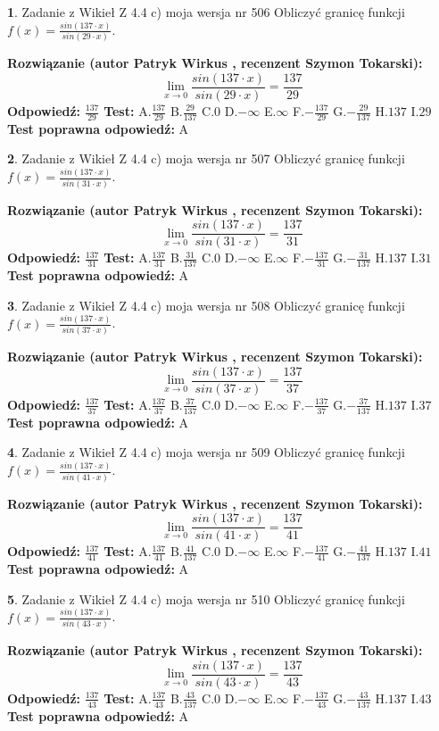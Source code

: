 \documentclass[12pt, a4paper]{article}
\theoremstyle{definition} %
\newtheorem{zad}{}
\newcommand{\zadStart}[1]{\begin{zad}#1\newline}
\newcommand{\zadStop}{\end{zad}}
\newcommand{\rozwStart}[2]{\noindent \textbf{Rozwiązanie (autor #1 , recenzent #2): }\newline}
\newcommand{\rozwStop}{\newline}
\newcommand{\odpStart}{\noindent \textbf{Odpowiedź:}\newline}
\newcommand{\odpStop}{\newline}
\newcommand{\testStart}{\noindent \textbf{Test:}\newline}
\newcommand{\testStop}{\newline}
\newcommand{\kluczStart}{\noindent \textbf{Test poprawna odpowiedź:}\newline}
\newcommand{\kluczStop}{\newline}
\begin{document}
\zadStart{Zadanie z Wikieł Z 4.4 c) moja wersja nr 506}
Obliczyć granicę funkcji $f(x)=\frac{sin(137\cdot x)}{sin(29\cdot x)}$.
\zadStop
\rozwStart{Patryk Wirkus}{Szymon Tokarski}
$$\lim\limits_{x\to 0}\frac{sin(137\cdot x)}{sin(29\cdot x)}=
\frac{137}{29}$$
\rozwStop
\odpStart
$\frac{137}{29}$
\odpStop
\testStart
A.$\frac{137}{29}$
B.$\frac{29}{137}$
C.$0$
D.$-\infty$
E.$\infty$
F.$-\frac{137}{29}$
G.$-\frac{29}{137}$
H.$137$
I.$29$
\testStop
\kluczStart
A
\kluczStop



\zadStart{Zadanie z Wikieł Z 4.4 c) moja wersja nr 507}
Obliczyć granicę funkcji $f(x)=\frac{sin(137\cdot x)}{sin(31\cdot x)}$.
\zadStop
\rozwStart{Patryk Wirkus}{Szymon Tokarski}
$$\lim\limits_{x\to 0}\frac{sin(137\cdot x)}{sin(31\cdot x)}=
\frac{137}{31}$$
\rozwStop
\odpStart
$\frac{137}{31}$
\odpStop
\testStart
A.$\frac{137}{31}$
B.$\frac{31}{137}$
C.$0$
D.$-\infty$
E.$\infty$
F.$-\frac{137}{31}$
G.$-\frac{31}{137}$
H.$137$
I.$31$
\testStop
\kluczStart
A
\kluczStop



\zadStart{Zadanie z Wikieł Z 4.4 c) moja wersja nr 508}
Obliczyć granicę funkcji $f(x)=\frac{sin(137\cdot x)}{sin(37\cdot x)}$.
\zadStop
\rozwStart{Patryk Wirkus}{Szymon Tokarski}
$$\lim\limits_{x\to 0}\frac{sin(137\cdot x)}{sin(37\cdot x)}=
\frac{137}{37}$$
\rozwStop
\odpStart
$\frac{137}{37}$
\odpStop
\testStart
A.$\frac{137}{37}$
B.$\frac{37}{137}$
C.$0$
D.$-\infty$
E.$\infty$
F.$-\frac{137}{37}$
G.$-\frac{37}{137}$
H.$137$
I.$37$
\testStop
\kluczStart
A
\kluczStop



\zadStart{Zadanie z Wikieł Z 4.4 c) moja wersja nr 509}
Obliczyć granicę funkcji $f(x)=\frac{sin(137\cdot x)}{sin(41\cdot x)}$.
\zadStop
\rozwStart{Patryk Wirkus}{Szymon Tokarski}
$$\lim\limits_{x\to 0}\frac{sin(137\cdot x)}{sin(41\cdot x)}=
\frac{137}{41}$$
\rozwStop
\odpStart
$\frac{137}{41}$
\odpStop
\testStart
A.$\frac{137}{41}$
B.$\frac{41}{137}$
C.$0$
D.$-\infty$
E.$\infty$
F.$-\frac{137}{41}$
G.$-\frac{41}{137}$
H.$137$
I.$41$
\testStop
\kluczStart
A
\kluczStop



\zadStart{Zadanie z Wikieł Z 4.4 c) moja wersja nr 510}
Obliczyć granicę funkcji $f(x)=\frac{sin(137\cdot x)}{sin(43\cdot x)}$.
\zadStop
\rozwStart{Patryk Wirkus}{Szymon Tokarski}
$$\lim\limits_{x\to 0}\frac{sin(137\cdot x)}{sin(43\cdot x)}=
\frac{137}{43}$$
\rozwStop
\odpStart
$\frac{137}{43}$
\odpStop
\testStart
A.$\frac{137}{43}$
B.$\frac{43}{137}$
C.$0$
D.$-\infty$
E.$\infty$
F.$-\frac{137}{43}$
G.$-\frac{43}{137}$
H.$137$
I.$43$
\testStop
\kluczStart
A
\kluczStop
\end{document}
